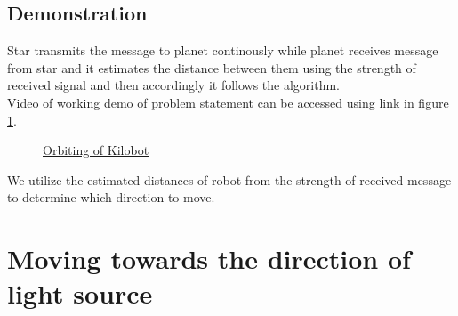 \section{Demonstration}
Star transmits the message to planet continously while planet receives message from star and it estimates the distance between them using the strength of received signal and then accordingly it follows the algorithm.\\
Video of working demo of problem statement can be accessed using link in figure \ref{fig:orbit}.
\begin{figure}[H]
	\centering
	\caption{\href{https://photos.app.goo.gl/xPYoywncwhCk585X8}{Orbiting of Kilobot}}
	\label{fig:orbit}
\end{figure}
We utilize the estimated distances of robot from the strength of received message to determine which direction to move. \\

\chapter{Moving towards the direction of light source}

